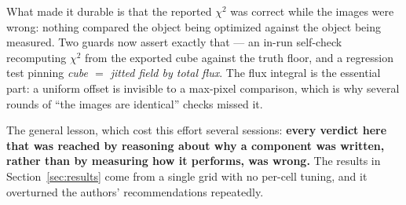 \documentclass[11pt]{article}
\begin{document}
What made it durable is that the reported $\chi^2$ was correct while the images were
wrong: nothing compared the object being optimized against the object being measured.
Two guards now assert exactly that --- an in-run self-check recomputing $\chi^2$ from
the exported cube against the truth floor, and a regression test pinning
\emph{cube $=$ jitted field by total flux}. The flux integral is the essential part: a
uniform offset is invisible to a max-pixel comparison, which is why several rounds of
``the images are identical'' checks missed it.

The general lesson, which cost this effort several sessions: \textbf{every verdict
here that was reached by reasoning about why a component was written, rather than by
measuring how it performs, was wrong.} The results in Section~\ref{sec:results} come
from a single grid with no per-cell tuning, and it overturned the authors'
recommendations repeatedly.
\end{document}
